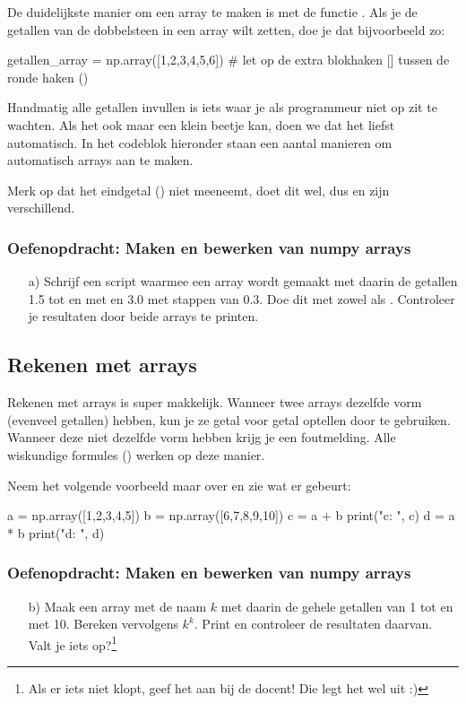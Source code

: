 \documentclass[a4paper,11pt, fleqn]{article}
\begin{document}
De duidelijkste manier om een array te maken is met de functie . Als je de getallen van de dobbelsteen in een array wilt zetten, doe je dat bijvoorbeeld zo:
\begin{python}
getallen_array = np.array([1,2,3,4,5,6]) 
# let op de extra blokhaken [] tussen de ronde haken ()
\end{python}

Handmatig alle getallen invullen is iets waar je als programmeur niet op zit te wachten. Als het ook maar een klein beetje kan, doen we dat het liefst automatisch. In het codeblok hieronder staan een aantal manieren om automatisch arrays aan te maken.


Merk op dat  het eindgetal () niet meeneemt,  doet dit wel, dus  en  zijn verschillend. 

\subsubsection*{Oefenopdracht: Maken en bewerken van numpy arrays}
\begin{itemize}
	\item[a)] Schrijf een script waarmee een array wordt gemaakt met daarin de getallen 1.5 tot en met en 3.0 met stappen van 0.3. Doe dit met zowel  als . Controleer je resultaten door beide arrays te printen.
\end{itemize}

\subsection{Rekenen met arrays}
Rekenen met arrays is super makkelijk. Wanneer twee arrays dezelfde vorm (evenveel getallen) hebben, kun je ze getal voor getal optellen door \pythoninline{+} te gebruiken. Wanneer deze niet dezelfde vorm hebben krijg je een foutmelding. Alle wiskundige formules (\pythoninline{+,-,/,*,**}) werken op deze manier.

Neem het volgende voorbeeld maar over en zie wat er gebeurt:
\begin{python}
a = np.array([1,2,3,4,5])
b = np.array([6,7,8,9,10])
c = a + b
print("c: ", c)
d = a * b
print("d: ", d)
\end{python}

\subsubsection*{Oefenopdracht: Maken en bewerken van numpy arrays}
\begin{itemize}
	\item[b)] Maak een array met de naam $k$ met daarin de gehele getallen van 1 tot en met 10. Bereken vervolgens $k^k$. Print en controleer de resultaten daarvan. Valt je iets op?\footnote{Als er iets niet klopt, geef het aan bij de docent! Die legt het wel uit :)}
\end{itemize}
\end{document}
